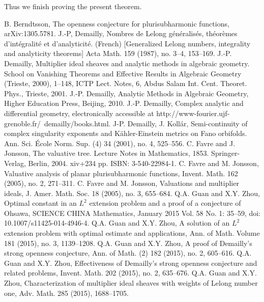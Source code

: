 \documentclass[reqno]{amsart}
\numberwithin{equation}{section}
\begin{document}
Thus we finish proving the present theorem.




\begin{thebibliography}{100}
B. Berndtsson, The openness conjecture for plurisubharmonic functions, arXiv:1305.5781.
J.-P, Demailly, Nombres de Lelong g\'{e}n\'{e}ralis\'{e}s, th\'{e}or\`{e}mes d'int\'{e}gralit\'{e} et d'analyticit\'{e}. (French) [Generalized Lelong numbers, integrality and analyticity theorems] Acta Math.  159  (1987),  no. 3--4, 153--169.
J.-P. Demailly, Multiplier ideal sheaves and analytic methods in algebraic geometry. School on Vanishing Theorems and Effective Results in Algebraic Geometry (Trieste, 2000), 1--148, ICTP Lect. Notes, 6, Abdus Salam Int. Cent. Theoret. Phys., Trieste, 2001.
J.-P. Demailly, Analytic Methods in Algebraic Geometry, Higher Education Press, Beijing, 2010.
J.-P. Demailly, Complex analytic and differential geometry, electronically accessible
at http://www-fourier.ujf-grenoble.fr/~demailly/books.html.
J-P. Demailly, J. Koll\'{a}r,
Semi-continuity of complex singularity exponents and K\"{a}hler-Einstein metrics on Fano orbifolds.
Ann. Sci. \'{E}cole Norm. Sup. (4) 34 (2001), no. 4, 525--556.
C. Favre and J. Jonsson, The valuative tree. Lecture Notes in Mathematics, 1853. Springer-Verlag, Berlin, 2004. xiv+234 pp. ISBN: 3-540-22984-1.
C. Favre and M. Jonsson, Valuative analysis of planar plurisubharmonic functions, Invent. Math. 162 (2005), no. 2, 271--311.
C. Favre and M. Jonsson, Valuations and multiplier ideals, J. Amer. Math. Soc. 18 (2005), no. 3, 655--684.
Q.A. Guan and X.Y. Zhou, Optimal constant in an $L^2$ extension problem
and a proof of a conjecture of Ohsawa, SCIENCE CHINA Mathematics, January 2015 Vol. 58 No. 1: 35--59, doi: 10.1007/s11425-014-4946-4.
Q.A. Guan and X.Y. Zhou,  A solution of an $L^{2}$ extension problem with optimal estimate and applications, Ann. of Math. Volume 181 (2015), no. 3, 1139--1208.
Q.A. Guan and X.Y. Zhou, A proof of Demailly's strong openness conjecture,
               Ann. of Math. (2) 182 (2015), no. 2, 605--616.
Q.A. Guan and X.Y. Zhou, Effectiveness of Demailly's strong openness conjecture and related problems, Invent. Math. 202 (2015), no. 2, 635--676.
Q.A. Guan and X.Y. Zhou, Characterization of multiplier ideal sheaves with weights of Lelong number one, Adv. Math. 285 (2015), 1688--1705.

\end{thebibliography}
\end{document}
